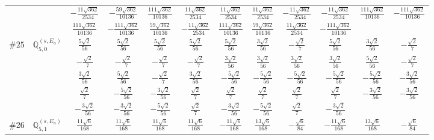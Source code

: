 \documentclass[fleqn,9pt,landscape]{jsarticle}
\begin{document}
\begin{center}
\begin{longtable}{lcccccccccc}
& $ - \frac{11 \sqrt{362}}{2534} $ & $ - \frac{59 \sqrt{362}}{10136} $ & $ \frac{111 \sqrt{362}}{10136} $ & $ \frac{11 \sqrt{362}}{2534} $ & $ \frac{11 \sqrt{362}}{2534} $ & $ \frac{11 \sqrt{362}}{2534} $ & $ - \frac{11 \sqrt{362}}{2534} $ & $ - \frac{11 \sqrt{362}}{2534} $ & $ \frac{111 \sqrt{362}}{10136} $ & $ - \frac{111 \sqrt{362}}{10136} $ \\
& $ \frac{111 \sqrt{362}}{10136} $ & $ - \frac{111 \sqrt{362}}{10136} $ & $ \frac{59 \sqrt{362}}{10136} $ & $ - \frac{11 \sqrt{362}}{2534} $ & $ \frac{111 \sqrt{362}}{10136} $ & $ \frac{59 \sqrt{362}}{10136} $ & $ \frac{11 \sqrt{362}}{2534} $ & $ - \frac{111 \sqrt{362}}{10136} $ & $  $ & $  $ \\ \hline
$ \#25\quad \mathbb{Q}_{5,0}^{(s,E_{u})} $ & $ \frac{5 \sqrt{2}}{56} $ & $ \frac{5 \sqrt{2}}{56} $ & $ \frac{5 \sqrt{2}}{56} $ & $ \frac{5 \sqrt{2}}{56} $ & $ \frac{5 \sqrt{2}}{56} $ & $ \frac{3 \sqrt{2}}{56} $ & $ - \frac{\sqrt{2}}{7} $ & $ \frac{5 \sqrt{2}}{56} $ & $ \frac{3 \sqrt{2}}{56} $ & $ - \frac{\sqrt{2}}{7} $ \\
& $ - \frac{\sqrt{2}}{7} $ & $ - \frac{\sqrt{2}}{7} $ & $ - \frac{\sqrt{2}}{7} $ & $ - \frac{\sqrt{2}}{7} $ & $ \frac{3 \sqrt{2}}{56} $ & $ \frac{3 \sqrt{2}}{56} $ & $ \frac{3 \sqrt{2}}{56} $ & $ \frac{3 \sqrt{2}}{56} $ & $ \frac{5 \sqrt{2}}{56} $ & $ - \frac{\sqrt{2}}{7} $ \\
& $ \frac{3 \sqrt{2}}{56} $ & $ \frac{5 \sqrt{2}}{56} $ & $ - \frac{\sqrt{2}}{7} $ & $ \frac{3 \sqrt{2}}{56} $ & $ - \frac{5 \sqrt{2}}{56} $ & $ - \frac{5 \sqrt{2}}{56} $ & $ - \frac{5 \sqrt{2}}{56} $ & $ - \frac{5 \sqrt{2}}{56} $ & $ - \frac{5 \sqrt{2}}{56} $ & $ - \frac{3 \sqrt{2}}{56} $ \\
& $ \frac{\sqrt{2}}{7} $ & $ - \frac{5 \sqrt{2}}{56} $ & $ - \frac{3 \sqrt{2}}{56} $ & $ \frac{\sqrt{2}}{7} $ & $ \frac{\sqrt{2}}{7} $ & $ \frac{\sqrt{2}}{7} $ & $ \frac{\sqrt{2}}{7} $ & $ \frac{\sqrt{2}}{7} $ & $ - \frac{3 \sqrt{2}}{56} $ & $ - \frac{3 \sqrt{2}}{56} $ \\
& $ - \frac{3 \sqrt{2}}{56} $ & $ - \frac{3 \sqrt{2}}{56} $ & $ - \frac{5 \sqrt{2}}{56} $ & $ \frac{\sqrt{2}}{7} $ & $ - \frac{3 \sqrt{2}}{56} $ & $ - \frac{5 \sqrt{2}}{56} $ & $ \frac{\sqrt{2}}{7} $ & $ - \frac{3 \sqrt{2}}{56} $ & $  $ & $  $ \\ \hline
$ \#26\quad \mathbb{Q}_{5,1}^{(s,E_{u})} $ & $ \frac{11 \sqrt{6}}{168} $ & $ \frac{11 \sqrt{6}}{168} $ & $ \frac{11 \sqrt{6}}{168} $ & $ \frac{11 \sqrt{6}}{168} $ & $ - \frac{11 \sqrt{6}}{168} $ & $ \frac{13 \sqrt{6}}{168} $ & $ - \frac{\sqrt{6}}{84} $ & $ - \frac{11 \sqrt{6}}{168} $ & $ \frac{13 \sqrt{6}}{168} $ & $ - \frac{\sqrt{6}}{84} $ \\

\end{longtable}
\end{center}
\end{document}

